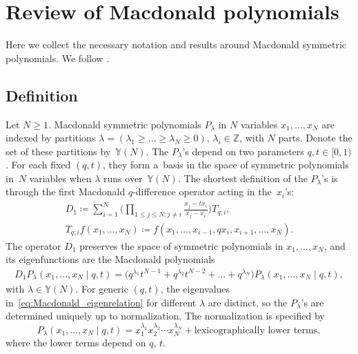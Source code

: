 \section{Review of Macdonald polynomials}\label{sec:macdonald_polynomials}

Here we collect the necessary notation and results
around Macdonald symmetric polynomials.
We follow \cite[Chapter VI]{Macdonald1995}.

\subsection{Definition}\label{sub:Macdonald_polynomials_definition}

Let $N\ge1$.
Macdonald symmetric polynomials $P_\lambda$ in $N$ variables $x_1,\dots,x_N$
are indexed by partitions
$\lambda=(\lambda_1\ge \dots\ge \lambda_N \ge0)$, $\lambda_i\in \mathbb{Z}$,
with $N$ parts. Denote the set of these partitions by~$\mathbb{Y}(N)$.
The $P_\lambda$'s
depend on two parameters $q,t\in[0,1)$. For each fixed
$(q,t)$, they form a~basis in the space of symmetric
polynomials in~$N$ variables when $\lambda$ runs over~$\mathbb{Y}(N)$.
The shortest definition of the
$P_\lambda$'s is through the first Macdonald $q$-difference operator
acting in the~$x_i$'s:
\begin{gather*}
	D_1\coloneqq \sum_{i=1}^{N}
	\biggl( \prod_{1\le j\le N\colon j\ne i}\frac{x_j-tx_i}{x_j-x_i} \biggr)
	T_{q;i},\\ T_{q;i}f(x_1,\dots,x_N )\coloneqq f(x_1,\dots,x_{i-1},qx_i,x_{i+1},\dots,x_N ).
\end{gather*}
The operator $D_1$ preserves the space of symmetric
polynomials in $x_1,\dots,x_N $, and its eigenfunctions
are the Macdonald polynomials
\begin{gather}
	D_1P_\lambda(x_1,\dots,x_N\mid q,t )=
	\bigl( q^{\lambda_1}t^{N-1}+q^{\lambda_2}t^{N-2}+\dots+q^{\lambda_N}
	\bigr)
	P_\lambda(x_1,\dots,x_N\mid q,t ),\label{eq:Macdonald_eigenrelation}
\end{gather}
with $\lambda\in \mathbb{Y}(N)$.
For generic $(q,t)$, the eigenvalues in~\eqref{eq:Macdonald_eigenrelation}
for different $\lambda$ are distinct, so
the $P_\lambda$'s are determined uniquely up to normalization.
The normalization is specified by
\begin{equation*}
	P_\lambda(x_1,\dots,x_N\mid q,t )=
	x_1^{\lambda_1}x_2^{\lambda_2}\cdots x_N^{\lambda_N} +
	\text{lexicographically lower terms},
\end{equation*}
where the lower terms depend on $q$, $t$.

